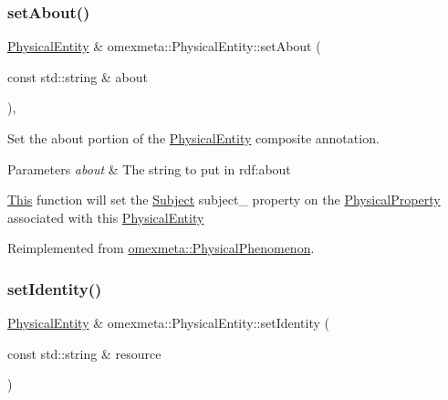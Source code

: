\subsubsection{\texorpdfstring{set\+About()}{setAbout()}}
{\footnotesize\ttfamily \hyperlink{classomexmeta_1_1PhysicalEntity}{Physical\+Entity} \& omexmeta\+::\+Physical\+Entity\+::set\+About (\begin{DoxyParamCaption}\item[{const std\+::string \&}]{about }\end{DoxyParamCaption})\hspace{0.3cm}{\ttfamily [override]}, {\ttfamily [virtual]}}



Set the about portion of the \hyperlink{classomexmeta_1_1PhysicalEntity}{Physical\+Entity} composite annotation. 


\begin{DoxyParams}{Parameters}
{\em about} & The string to put in rdf\+:about\\
\hline
\end{DoxyParams}
\hyperlink{classThis}{This} function will set the \hyperlink{classomexmeta_1_1Subject}{Subject} subject\+\_\+ property on the \hyperlink{classomexmeta_1_1PhysicalProperty}{Physical\+Property} associated with this \hyperlink{classomexmeta_1_1PhysicalEntity}{Physical\+Entity} 

Reimplemented from \hyperlink{classomexmeta_1_1PhysicalPhenomenon}{omexmeta\+::\+Physical\+Phenomenon}.

\mbox{\label{classomexmeta_1_1PhysicalEntity_a4d4c3ee9572b19e44e79a44f18f1ac31}} 
\subsubsection{\texorpdfstring{set\+Identity()}{setIdentity()}}
{\footnotesize\ttfamily \hyperlink{classomexmeta_1_1PhysicalEntity}{Physical\+Entity} \& omexmeta\+::\+Physical\+Entity\+::set\+Identity (\begin{DoxyParamCaption}\item[{const std\+::string \&}]{resource }\end{DoxyParamCaption})}



